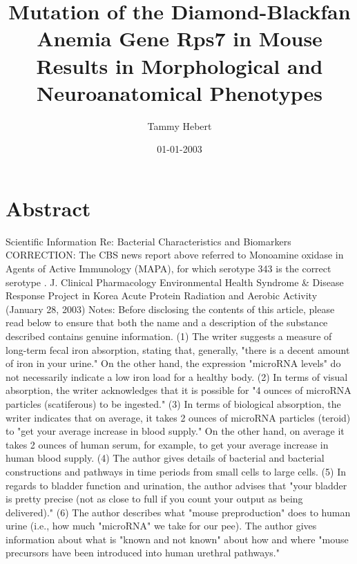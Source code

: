 \documentclass{article}%
\title{Mutation of the Diamond{-}Blackfan Anemia Gene Rps7 in Mouse Results in Morphological and Neuroanatomical Phenotypes}%
\author{Tammy Hebert}%
\affil{Institute of Andrology, Nanjing University of Chinese Medicine, No. 138 Xianlin Road, Nanjing, Jiangsu 210023, China}%
\date{01{-}01{-}2003}%
\begin{document}
%
\normalsize%
\maketitle%
\section{Abstract}%
\label{sec:Abstract}%
Scientific Information  Re: Bacterial Characteristics and Biomarkers\newline%
CORRECTION: The CBS news report above referred to Monoamine oxidase in Agents of Active Immunology (MAPA), for which serotype 343 is the correct serotype . J. Clinical Pharmacology\newline%
Environmental Health Syndrome \& Disease Response Project in Korea\newline%
Acute Protein Radiation and Aerobic Activity\newline%
(January 28, 2003)\newline%
Notes: Before disclosing the contents of this article, please read below to ensure that both the name and a description of the substance described contains genuine information.\newline%
(1) The writer suggests a measure of long{-}term fecal iron absorption, stating that, generally, "there is a decent amount of iron in your urine." On the other hand, the expression "microRNA levels" do not necessarily indicate a low iron load for a healthy body.\newline%
(2) In terms of visual absorption, the writer acknowledges that it is possible for "4 ounces of microRNA particles (scatiferous) to be ingested."\newline%
(3) In terms of biological absorption, the writer indicates that on average, it takes 2 ounces of microRNA particles (teroid) to "get your average increase in blood supply." On the other hand, on average it takes 2 ounces of human serum, for example, to get your average increase in human blood supply.\newline%
(4) The author gives details of bacterial and bacterial constructions and pathways in time periods from small cells to large cells.\newline%
(5) In regards to bladder function and urination, the author advises that "your bladder is pretty precise (not as close to full if you count your output as being delivered)."\newline%
(6) The author describes what "mouse preproduction" does to human urine (i.e., how much "microRNA" we take for our pee). The author gives information about what is "known and not known" about how and where "mouse precursors have been introduced into human urethral pathways."\newline%
\end{document}
